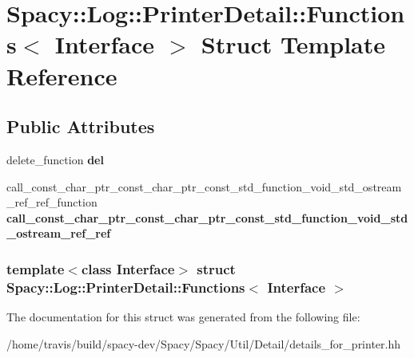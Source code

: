 \hypertarget{structSpacy_1_1Log_1_1PrinterDetail_1_1Functions}{\section{\-Spacy\-:\-:\-Log\-:\-:\-Printer\-Detail\-:\-:\-Functions$<$ \-Interface $>$ \-Struct \-Template \-Reference}
\label{structSpacy_1_1Log_1_1PrinterDetail_1_1Functions}
}
\subsection*{\-Public \-Attributes}
\begin{DoxyCompactItemize}
\item 
\hypertarget{structSpacy_1_1Log_1_1PrinterDetail_1_1Functions_a302f8d42cdcf648a63dc2e377be286f6}{delete\-\_\-function {\bfseries del}}\label{structSpacy_1_1Log_1_1PrinterDetail_1_1Functions_a302f8d42cdcf648a63dc2e377be286f6}

\item 
\hypertarget{structSpacy_1_1Log_1_1PrinterDetail_1_1Functions_ab1aa1bae2a60e5c140affe0dd3febda7}{call\-\_\-const\-\_\-char\-\_\-ptr\-\_\-const\-\_\-char\-\_\-ptr\-\_\-const\-\_\-std\-\_\-function\-\_\-void\-\_\-std\-\_\-ostream\-\_\-ref\-\_\-ref\-\_\-function {\bfseries call\-\_\-const\-\_\-char\-\_\-ptr\-\_\-const\-\_\-char\-\_\-ptr\-\_\-const\-\_\-std\-\_\-function\-\_\-void\-\_\-std\-\_\-ostream\-\_\-ref\-\_\-ref}}\label{structSpacy_1_1Log_1_1PrinterDetail_1_1Functions_ab1aa1bae2a60e5c140affe0dd3febda7}

\end{DoxyCompactItemize}
\subsubsection*{template$<$class \-Interface$>$ struct Spacy\-::\-Log\-::\-Printer\-Detail\-::\-Functions$<$ Interface $>$}



\-The documentation for this struct was generated from the following file\-:\begin{DoxyCompactItemize}
\item 
/home/travis/build/spacy-\/dev/\-Spacy/\-Spacy/\-Util/\-Detail/details\-\_\-for\-\_\-printer.\-hh\end{DoxyCompactItemize}
